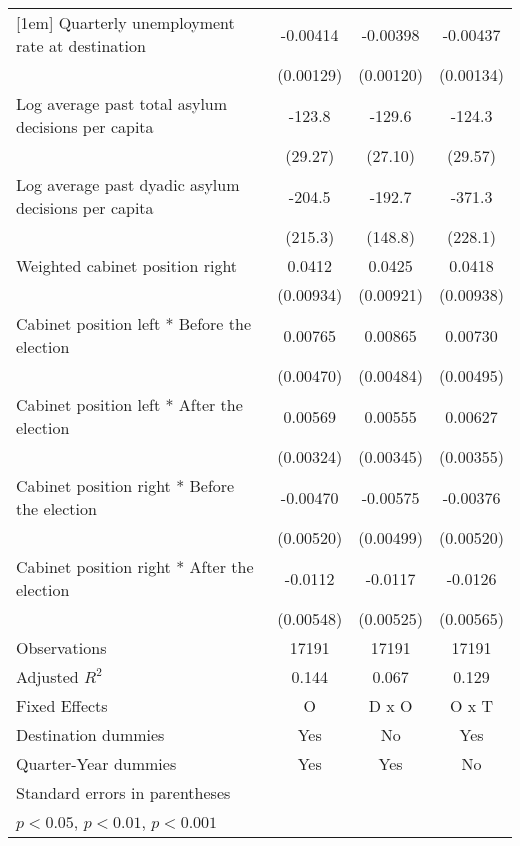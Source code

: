 \begin{table}[htbp]
\begin{tabular}{l*{3}{c}}
[1em]
Quarterly unemployment rate at destination&    -0.00414\sym{**} &    -0.00398\sym{**} &    -0.00437\sym{**} \\
                    &   (0.00129)         &   (0.00120)         &   (0.00134)         \\
[1em]
Log average past total asylum decisions per capita&      -123.8\sym{***}&      -129.6\sym{***}&      -124.3\sym{***}\\
                    &     (29.27)         &     (27.10)         &     (29.57)         \\
[1em]
Log average past dyadic asylum decisions per capita&      -204.5         &      -192.7         &      -371.3         \\
                    &     (215.3)         &     (148.8)         &     (228.1)         \\
[1em]
Weighted cabinet position right&      0.0412\sym{***}&      0.0425\sym{***}&      0.0418\sym{***}\\
                    &   (0.00934)         &   (0.00921)         &   (0.00938)         \\
[1em]
Cabinet position left * Before the election&     0.00765         &     0.00865         &     0.00730         \\
                    &   (0.00470)         &   (0.00484)         &   (0.00495)         \\
[1em]
Cabinet position left * After the election&     0.00569         &     0.00555         &     0.00627         \\
                    &   (0.00324)         &   (0.00345)         &   (0.00355)         \\
[1em]
Cabinet position right * Before the election&    -0.00470         &    -0.00575         &    -0.00376         \\
                    &   (0.00520)         &   (0.00499)         &   (0.00520)         \\
[1em]
Cabinet position right * After the election&     -0.0112\sym{*}  &     -0.0117\sym{*}  &     -0.0126\sym{*}  \\
                    &   (0.00548)         &   (0.00525)         &   (0.00565)         \\
\hline
Observations        &       17191         &       17191         &       17191         \\
Adjusted \(R^{2}\)  &       0.144         &       0.067         &       0.129         \\
Fixed Effects       &           O         &       D x O         &       O x T         \\
Destination dummies &         Yes         &          No         &         Yes         \\
Quarter-Year dummies&         Yes         &         Yes         &          No         \\
\hline\hline
\multicolumn{4}{l}{\footnotesize Standard errors in parentheses}\\
\multicolumn{4}{l}{\footnotesize \sym{*} \(p<0.05\), \sym{**} \(p<0.01\), \sym{***} \(p<0.001\)}\\
\end{tabular}
\end{table}

